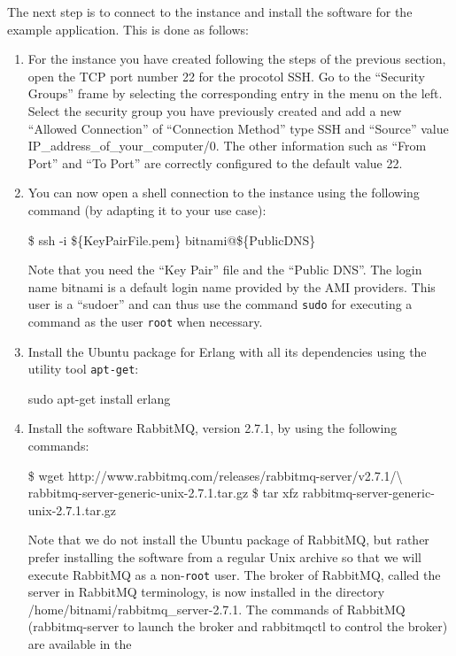 The next step is to connect to the instance and install the software
for the example application. This is done as follows:
\begin{enumerate}
\item For the instance you have created following the steps of the
  previous section, open the TCP port number \textsf{22} for the
  procotol SSH. Go to the ``Security Groups'' frame by selecting the
  corresponding entry in the menu on the left. Select the security
  group you have previously created and add a new ``Allowed
  Connection'' of ``Connection Method'' type \textsf{SSH} and
  ``Source'' value \textsf{IP\_address\_of\_your\_computer/0}. The
  other information such as ``From Port'' and ``To Port'' are
  correctly configured to the default value \textsf{22}.
\item You can now open a shell connection to the instance using the
  following command (by adapting it to your use case):
\begin{shellcmd}
\$ ssh -i \$\{KeyPairFile.pem\} bitnami@\$\{PublicDNS\}
\end{shellcmd}
Note that you need the ``Key Pair'' file and the ``Public DNS''. The
login name \textsf{bitnami} is a default login name provided by the
AMI providers. This user is a ``sudoer'' and can thus use the command
\texttt{sudo} for executing a command as the user \texttt{root} when
necessary.
\item Install the Ubuntu package for Erlang with all its
  dependencies using the utility tool \texttt{apt-get}:
\begin{shellcmd}
sudo apt-get install erlang
\end{shellcmd}
\item Install the software RabbitMQ, version 2.7.1, by using the
  following commands:\\
\begin{shellcmd}
\$ wget http://www.rabbitmq.com/releases/rabbitmq-server/v2.7.1/\textbackslash
  rabbitmq-server-generic-unix-2.7.1.tar.gz
\$ tar xfz rabbitmq-server-generic-unix-2.7.1.tar.gz
\end{shellcmd}
Note that we do not install the Ubuntu package of RabbitMQ, but rather
prefer installing the software from a regular Unix archive so that we
will execute RabbitMQ as a non-\texttt{root} user.  The broker of
RabbitMQ, called the server in RabbitMQ terminology, is now installed
in the directory \textsf{/home/bitnami/rabbitmq\_server-2.7.1}.  The
commands of RabbitMQ (\textsf{rabbitmq-server} to launch the broker
and \textsf{rabbitmqctl} to control the broker) are available in the

\end{enumerate}
